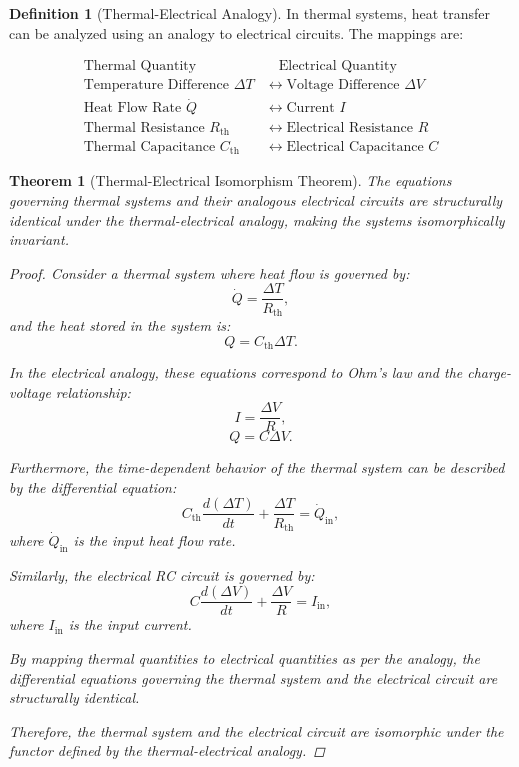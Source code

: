 \documentclass{article}
\newtheorem{theorem}{Theorem}[section]
\theoremstyle{definition}
\newtheorem{definition}{Definition}[section]
\theoremstyle{remark}
\begin{document}
	\begin{definition}[Thermal-Electrical Analogy]
		In thermal systems, heat transfer can be analyzed using an analogy to electrical circuits. The mappings are:
		
		\begin{align*}
			\text{Thermal Quantity} &\quad \text{Electrical Quantity} \\
			\hline
			\text{Temperature Difference } \Delta T &\leftrightarrow \text{Voltage Difference } \Delta V \\
			\text{Heat Flow Rate } \dot{Q} &\leftrightarrow \text{Current } I \\
			\text{Thermal Resistance } R_{\text{th}} &\leftrightarrow \text{Electrical Resistance } R \\
			\text{Thermal Capacitance } C_{\text{th}} &\leftrightarrow \text{Electrical Capacitance } C
		\end{align*}
	\end{definition}
	
	\begin{theorem}[Thermal-Electrical Isomorphism Theorem]
		The equations governing thermal systems and their analogous electrical circuits are structurally identical under the thermal-electrical analogy, making the systems isomorphically invariant.
		
		\begin{proof}
			Consider a thermal system where heat flow is governed by:
			\[
			\dot{Q} = \dfrac{\Delta T}{R_{\text{th}}},
			\]
			and the heat stored in the system is:
			\[
			Q = C_{\text{th}} \Delta T.
			\]
			
			In the electrical analogy, these equations correspond to Ohm's law and the charge-voltage relationship:
			\[
			I = \dfrac{\Delta V}{R},
			\]
			\[
			Q = C \Delta V.
			\]
			
			Furthermore, the time-dependent behavior of the thermal system can be described by the differential equation:
			\[
			C_{\text{th}} \dfrac{d (\Delta T)}{dt} + \dfrac{\Delta T}{R_{\text{th}}} = \dot{Q}_{\text{in}},
			\]
			where $\dot{Q}_{\text{in}}$ is the input heat flow rate.
			
			Similarly, the electrical RC circuit is governed by:
			\[
			C \dfrac{d (\Delta V)}{dt} + \dfrac{\Delta V}{R} = I_{\text{in}},
			\]
			where $I_{\text{in}}$ is the input current.
			
			By mapping thermal quantities to electrical quantities as per the analogy, the differential equations governing the thermal system and the electrical circuit are structurally identical.
			
			Therefore, the thermal system and the electrical circuit are isomorphic under the functor defined by the thermal-electrical analogy.
			
		\end{proof}
	\end{theorem}
	
\end{document}
